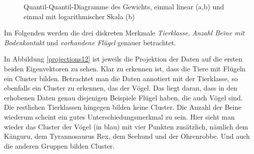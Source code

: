 \begin{figure}
  \qquad
  \qquad
  
  \caption{ Quantil-Quantil-Diagramme des Gewichts, einmal linear (a,b) und einmal mit logarithmischer Skala (b)}
  \label{qqdiagrams_weight}
 \end{figure}

 
 
 Im Folgenden werden die drei diskreten Merkmale \emph{Tierklasse}, \emph{Anzahl Beine mit Bodenkontakt} und \emph{vorhandene Flügel} genauer betrachtet.
 
 In Abbildung \ref{projections12} ist jeweils die Projektion der Daten auf die ersten beiden Eigenvektoren zu sehen. Klar zu erkennen ist, dass die Tiere mit Flügeln ein Cluster bilden. Betrachtet man die Daten annotiert mit der Tierklasse, so ebenfalls ein Cluster zu erkennen, das der Vögel. Das liegt daran, dass in den erhobenen Daten genau diejenigen Beispiele Flügel haben, die auch Vögel sind. Die restlichen Tierklassen hingegen bilden keine Cluster.
 Die Anzahl der Beine wiederum scheint ein gutes Unterschiedungsmerkmal zu sein. Hier sieht man wieder das Cluster der Vögel (in blau) mit vier Punkten zusätzlich, nämlich dem Känguru, dem Tyrannosaurus Rex, dem Seehund und der Ohrenrobbe. Und auch die anderen Gruppen bilden Cluster.
 

